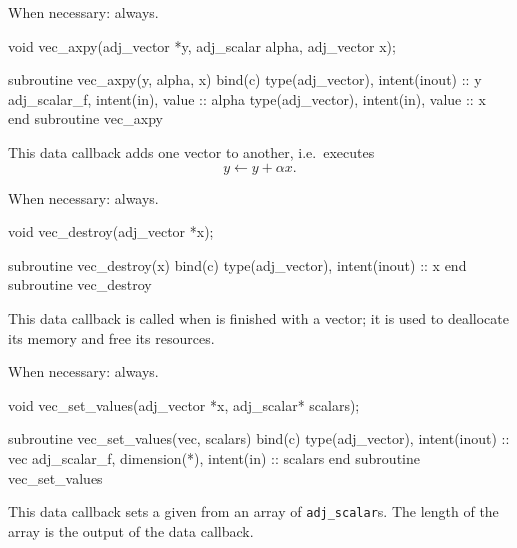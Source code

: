 When necessary: always.
\begin{framed}
\begin{minipage}{\columnwidth}
\begin{ccode}
  void vec_axpy(adj_vector *y, adj_scalar alpha, adj_vector x);
\end{ccode}
\begin{fortrancode}
  subroutine vec_axpy(y, alpha, x) bind(c)
    type(adj_vector), intent(inout) :: y
    adj_scalar_f, intent(in), value :: alpha
    type(adj_vector), intent(in), value :: x
  end subroutine vec_axpy
\end{fortrancode}
\end{minipage}
\end{framed}
This data callback adds one vector to another, i.e.\ executes
\begin{equation*}
y \leftarrow y + \alpha x.
\end{equation*}

When necessary: always.
\begin{framed}
\begin{minipage}{\columnwidth}
\begin{ccode}
  void vec_destroy(adj_vector *x);
\end{ccode}
\begin{fortrancode}
  subroutine vec_destroy(x) bind(c)
    type(adj_vector), intent(inout) :: x
  end subroutine vec_destroy
\end{fortrancode}
\end{minipage}
\end{framed}
This data callback is called when \libadjoint is finished
with a vector; it is used to deallocate its memory and free
its resources.

When necessary: always.
\begin{framed}
\begin{minipage}{\columnwidth}
\begin{ccode}
  void vec_set_values(adj_vector *x, adj_scalar* scalars);
\end{ccode}
\begin{fortrancode}
  subroutine vec_set_values(vec, scalars) bind(c)
    type(adj_vector), intent(inout) :: vec
    adj_scalar_f, dimension(*), intent(in) :: scalars
  end subroutine vec_set_values
\end{fortrancode}
\end{minipage}
\end{framed}
This data callback sets a given  from an array
of \texttt{adj_scalar}s. The length of the array is the output of
the  data callback.

